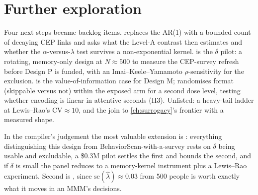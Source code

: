 \section{Further exploration}

Four next steps became backlog items.  replaces the AR(1) with a bounded count of decaying CEP links and asks what the Level-A contrast then estimates and whether the $\alpha$-versus-$\lambda$ test survives a non-exponential kernel.  is the $\delta$ pilot: a rotating, memory-only design at $N \approx 500$ to measure the CEP-survey refresh before Design P is funded, with an Imai--Keele--Yamamoto $\rho$-sensitivity for the exclusion.  is the value-of-information case for Design M;  randomises format (skippable versus not) within the exposed arm for a second dose level, testing whether encoding is linear in attentive seconds (H3). Unlisted: a heavy-tail ladder at Lewis--Rao's $\mathrm{CV} \approx 10$, and the join to \cref{ch:surrogacy}'s frontier with a measured shape.

In the compiler's judgement the most valuable extension is : everything distinguishing this design from BehaviorScan-with-a-survey rests on $\delta$ being usable and excludable, a \$0.3M pilot settles the first and bounds the second, and if $\delta$ is small the panel reduces to a memory-kernel instrument plus a Lewis--Rao experiment. Second is , since $\mathrm{se}(\hat\lambda) \approx 0.03$ from 500 people is worth exactly what it moves in an MMM's decisions.

